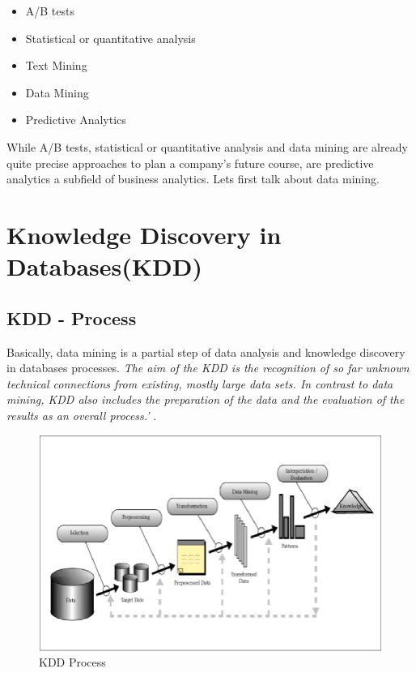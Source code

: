\documentclass[12pt,twocolumn,twoside]{conference}   %
\begin{document}
\begin{itemize}
\item A/B tests
\item Statistical or quantitative analysis
\item Text Mining
\item Data Mining
\item Predictive Analytics
\end{itemize}

While A/B tests, statistical or quantitative analysis and data mining are already quite precise approaches to plan a company's future course, are predictive analytics a subfield of business analytics. Lets first talk about data mining.

\section{Knowledge Discovery in Databases(KDD) }


\subsection{KDD - Process}
Basically, data mining is a partial step of data analysis and knowledge discovery in databases processes. \textit{The aim of the KDD is the recognition of so far unknown technical connections from existing, mostly large data sets. In contrast to data mining, KDD also includes the preparation of the data and the evaluation of the results as an overall process.'} \cite{3}.

\begin{figure}
\centering
\includegraphics[width=16cm]{Abbildungen/KDD.png}
\caption{KDD Process \cite{11} }\label{visina8}
\end{figure}
\end{document}
